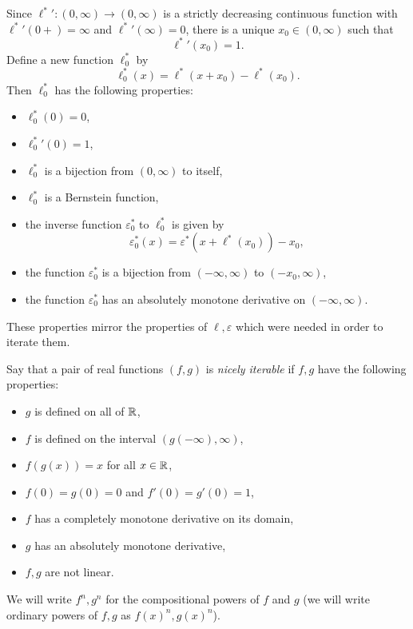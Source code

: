\documentclass[letterpaper,11pt]{article}
\begin{document}
Since ${\ell^*}' : (0,\infty) \rightarrow (0,\infty)$ is a strictly decreasing continuous function with ${\ell^*}'(0+) = \infty$ and ${\ell^*}'(\infty) = 0$, there is a unique $x_0 \in (0,\infty)$ such that
\[
{\ell^*}'(x_0) = 1.
\]
Define a new function $\ell_0^*$ by
\[
\ell_0^*(x) = \ell^*(x + x_0) - \ell^*(x_0).
\]
Then $\ell_0^*$ has the following properties:
\begin{itemize}
\item $\ell_0^*(0) = 0$,
\item ${\ell_0^*}'(0) = 1$,
\item $\ell_0^*$ is a bijection from $(0,\infty)$ to itself,
\item $\ell_0^*$ is a Bernstein function,
\item the inverse function $\varepsilon_0^*$ to $\ell_0^*$ is given by
\[
\varepsilon_0^*(x) = \varepsilon^*(x + \ell^*(x_0)) - x_0,
\]
\item the function $\varepsilon_0^*$ is a bijection from $(-\infty,\infty)$ to $(-x_0,\infty)$,
\item the function $\varepsilon_0^*$ has an absolutely monotone derivative on $(-\infty,\infty)$.
\end{itemize}
These properties mirror the properties of $\ell, \varepsilon$ which were needed in order to iterate them.

\begin{comment}
f(g(x)) = x, and g has absolutely monotone derivative
then
g'f'(g) = 1 -> f' > 0
g''f'(g) + g'^2f''(g) = 0 -> f'' < 0
g'''f'(g) + 3g''g'f''(g) + g'^3f'''(g) = 0 -> ?
(g'''-3g''^2/g')f'(g) + g'^3f'''(g) = 0
\end{comment}

\begin{defn} Say that a pair of real functions $(f,g)$ is \emph{nicely iterable} if $f,g$ have the following properties:
\begin{itemize}
\item $g$ is defined on all of $\mathbb{R}$,
\item $f$ is defined on the interval $(g(-\infty),\infty)$,
\item $f(g(x)) = x$ for all $x \in \mathbb{R}$,
\item $f(0) = g(0) = 0$ and $f'(0) = g'(0) = 1$,
\item $f$ has a completely monotone derivative on its domain,
\item $g$ has an absolutely monotone derivative,
\item $f,g$ are not linear.
\end{itemize}
\end{defn}
We will write $f^n, g^n$ for the compositional powers of $f$ and $g$ (we will write ordinary powers of $f,g$ as $f(x)^n, g(x)^n$).
\end{document}
